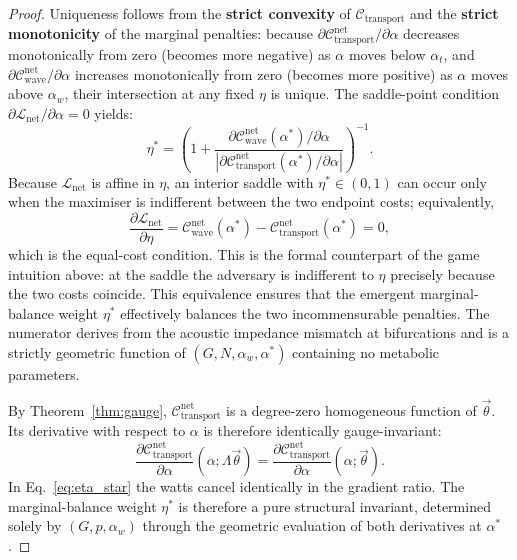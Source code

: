 \begin{proof}
Uniqueness follows from the \textbf{strict convexity} of
$\mathcal{C}_{\mathrm{transport}}$ and the \textbf{strict monotonicity} of the
marginal penalties: because $\partial
\mathcal{C}_{\mathrm{transport}}^{\mathrm{net}}/\partial \alpha$ decreases
monotonically from zero (becomes more negative) as $\alpha$ moves below
$\alpha_t$, and $\partial \mathcal{C}_{\mathrm{wave}}^{\mathrm{net}}/\partial
\alpha$ increases monotonically from zero (becomes more positive) as $\alpha$
moves above $\alpha_w$, their intersection at any fixed $\eta$ is unique. The
saddle-point condition $\partial\mathcal{L}_{\mathrm{net}}/\partial\alpha = 0$
yields:
\begin{equation}
    \eta^* = \left( 1 + \frac{\partial \mathcal{C}_{\mathrm{wave}}^{\mathrm{net}}
    (\alpha^*) / \partial \alpha}
    {|\partial \mathcal{C}_{\mathrm{transport}}^{\mathrm{net}}(\alpha^*)
    / \partial \alpha|} \right)^{-1}.
    \label{eq:eta_star}
\end{equation}
Because $\mathcal{L}_{\mathrm{net}}$ is affine in $\eta$, an interior
saddle with $\eta^*\in(0,1)$ can occur only when the maximiser is indifferent
between the two endpoint costs; equivalently,
\begin{equation*}
  \frac{\partial\mathcal{L}_{\mathrm{net}}}{\partial\eta}
  = \mathcal{C}_{\mathrm{wave}}^{\mathrm{net}}(\alpha^*)
  - \mathcal{C}_{\mathrm{transport}}^{\mathrm{net}}(\alpha^*) = 0,
\end{equation*}
which is the equal-cost condition. This is the formal counterpart of the
game intuition above: at the saddle the adversary is indifferent to $\eta$
precisely because the two costs coincide. This equivalence ensures that the
emergent marginal-balance weight $\eta^*$ effectively balances the two
incommensurable penalties. The numerator derives from the acoustic impedance
mismatch at bifurcations and is a strictly geometric function of $(G, N,
\alpha_w, \alpha^*)$ containing no metabolic parameters.

By Theorem~\ref{thm:gauge}, $\mathcal{C}_{\mathrm{transport}}^{\mathrm{net}}$ is
a degree-zero homogeneous function of $\vec{\theta}$. Its derivative with
respect to $\alpha$ is therefore identically gauge-invariant:
\begin{equation}
    \frac{\partial\mathcal{C}_{\mathrm{transport}}^{\mathrm{net}}}
    {\partial\alpha}(\alpha; \Lambda\vec{\theta})
    = \frac{\partial\mathcal{C}_{\mathrm{transport}}^{\mathrm{net}}}
    {\partial\alpha}(\alpha; \vec{\theta}).
\end{equation}
In Eq.~\eqref{eq:eta_star} the watts cancel identically in the gradient ratio.
The marginal-balance weight $\eta^*$ is therefore a pure structural
invariant, determined solely by $(G, p, \alpha_w)$ through the geometric
evaluation of both derivatives at $\alpha^*$.
\end{proof}

